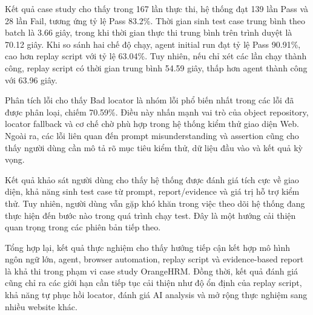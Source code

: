 Kết quả case study cho thấy trong 167 lần thực thi, hệ thống đạt 139 lần Pass và 28 lần Fail, tương ứng tỷ lệ Pass 83.2\%. Thời gian sinh test case trung bình theo batch là 3.66 giây, trong khi thời gian thực thi trung bình trên trình duyệt là 70.12 giây. Khi so sánh hai chế độ chạy, agent initial run đạt tỷ lệ Pass 90.91\%, cao hơn replay script với tỷ lệ 63.04\%. Tuy nhiên, nếu chỉ xét các lần chạy thành công, replay script có thời gian trung bình 54.59 giây, thấp hơn agent thành công với 63.96 giây.

Phân tích lỗi cho thấy Bad locator là nhóm lỗi phổ biến nhất trong các lỗi đã được phân loại, chiếm 70.59\%. Điều này nhấn mạnh vai trò của object repository, locator fallback và cơ chế chờ phù hợp trong hệ thống kiểm thử giao diện Web. Ngoài ra, các lỗi liên quan đến prompt misunderstanding và assertion cũng cho thấy người dùng cần mô tả rõ mục tiêu kiểm thử, dữ liệu đầu vào và kết quả kỳ vọng.

Kết quả khảo sát người dùng cho thấy hệ thống được đánh giá tích cực về giao diện, khả năng sinh test case từ prompt, report/evidence và giá trị hỗ trợ kiểm thử. Tuy nhiên, người dùng vẫn gặp khó khăn trong việc theo dõi hệ thống đang thực hiện đến bước nào trong quá trình chạy test. Đây là một hướng cải thiện quan trọng trong các phiên bản tiếp theo.

Tổng hợp lại, kết quả thực nghiệm cho thấy hướng tiếp cận kết hợp mô hình ngôn ngữ lớn, agent, browser automation, replay script và evidence-based report là khả thi trong phạm vi case study OrangeHRM. Đồng thời, kết quả đánh giá cũng chỉ ra các giới hạn cần tiếp tục cải thiện như độ ổn định của replay script, khả năng tự phục hồi locator, đánh giá AI analysis và mở rộng thực nghiệm sang nhiều website khác.
